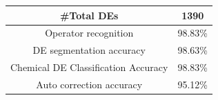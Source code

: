 

\begin{table}
\begin{center}
 \begin{tabular}{| c | c |}
 \hline
 \#Total DEs & 1390\\
 \hline
Operator recognition & 98.83\% \\
\hline
 DE segmentation accuracy & 98.63\% \\
 \hline
Chemical DE Classification Accuracy & 98.83\%\\
\hline 
Auto correction accuracy & 95.12\% \\
\hline

 \end{tabular}
 \end{center}
 \label{table:result}
 \end{table}


